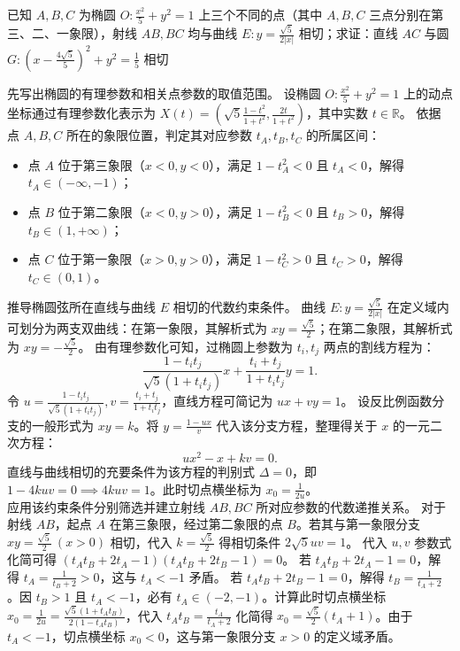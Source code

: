 \begin{example}
已知 \(A,B,C\) 为椭圆 \(O: \frac{x^2}{5} + y^2 = 1\) 上三个不同的点（其中 \(A,B,C\) 三点分别在第三、二、一象限），射线 \(AB,BC\) 均与曲线 \(E: y = \frac{\sqrt{5}}{2|x|}\) 相切；求证：直线 \(AC\) 与圆 \(G: \left(x - \frac{4\sqrt{5}}{5}\right)^2 + y^2 = \frac{1}{5}\) 相切
\end{example}
\begin{solution}
先写出椭圆的有理参数和相关点参数的取值范围。
设椭圆 $O: \frac{x^2}{5} + y^2 = 1$ 上的动点坐标通过有理参数化表示为 $X(t) = \left( \sqrt{5} \frac{1-t^2}{1+t^2}, \frac{2t}{1+t^2} \right)$，其中实数 $t \in \mathbb{R}$。
依据点 $A, B, C$ 所在的象限位置，判定其对应参数 $t_A, t_B, t_C$ 的所属区间：
\begin{itemize}
\item 点 $A$ 位于第三象限（$x<0, y<0$），满足 $1-t_A^2 < 0$ 且 $t_A < 0$，解得 $t_A \in (-\infty, -1)$；
\item 点 $B$ 位于第二象限（$x<0, y>0$），满足 $1-t_B^2 < 0$ 且 $t_B > 0$，解得 $t_B \in (1, +\infty)$；
\item 点 $C$ 位于第一象限（$x>0, y>0$），满足 $1-t_C^2 > 0$ 且 $t_C > 0$，解得 $t_C \in (0, 1)$。
\end{itemize}
推导椭圆弦所在直线与曲线 $E$ 相切的代数约束条件。
曲线 $E: y = \frac{\sqrt{5}}{2|x|}$ 在定义域内可划分为两支双曲线：在第一象限，其解析式为 $xy = \frac{\sqrt{5}}{2}$；在第二象限，其解析式为 $xy = -\frac{\sqrt{5}}{2}$。
由有理参数化可知，过椭圆上参数为 $t_i, t_j$ 两点的割线方程为：
\[ \frac{1-t_i t_j}{\sqrt{5}(1+t_i t_j)} x + \frac{t_i+t_j}{1+t_i t_j} y = 1. \]
令 $u = \frac{1-t_i t_j}{\sqrt{5}(1+t_i t_j)}, v = \frac{t_i+t_j}{1+t_i t_j}$，直线方程可简记为 $ux + vy = 1$。
设反比例函数分支的一般形式为 $xy = k$。将 $y = \frac{1-ux}{v}$ 代入该分支方程，整理得关于 $x$ 的一元二次方程：
\[ ux^2 - x + kv = 0. \]
直线与曲线相切的充要条件为该方程的判别式 $\Delta = 0$，即 $1 - 4kuv = 0 \implies 4kuv = 1$。此时切点横坐标为 $x_0 = \frac{1}{2u}$。\\
应用该约束条件分别筛选并建立射线 $AB, BC$ 所对应参数的代数递推关系。
对于射线 $AB$，起点 $A$ 在第三象限，经过第二象限的点 $B$。若其与第一象限分支 $xy = \frac{\sqrt{5}}{2}\ (x>0)$ 相切，代入 $k = \frac{\sqrt{5}}{2}$ 得相切条件 $2\sqrt{5}uv = 1$。
代入 $u,v$ 参数式化简可得 $(t_A t_B + 2t_A - 1)(t_A t_B + 2t_B - 1) = 0$。
若 $t_A t_B + 2t_A - 1 = 0$，解得 $t_A = \frac{1}{t_B+2} > 0$，这与 $t_A < -1$ 矛盾。
若 $t_A t_B + 2t_B - 1 = 0$，解得 $t_B = \frac{1}{t_A+2}$。因 $t_B > 1$ 且 $t_A < -1$，必有 $t_A \in (-2, -1)$。计算此时切点横坐标 $x_0 = \frac{1}{2u} = \frac{\sqrt{5}(1+t_A t_B)}{2(1-t_A t_B)}$，代入 $t_A t_B = \frac{t_A}{t_A+2}$ 化简得 $x_0 = \frac{\sqrt{5}}{2}(t_A+1)$。由于 $t_A < -1$，切点横坐标 $x_0 < 0$，这与第一象限分支 $x > 0$ 的定义域矛盾。

\end{solution}
